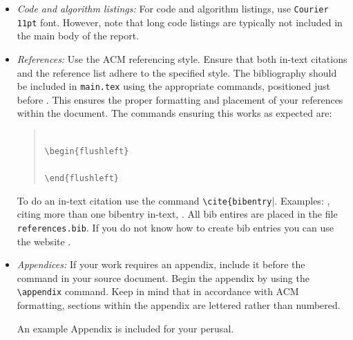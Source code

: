 \begin{itemize}
    \item \emph{Code and algorithm listings:} For code and algorithm listings, use \verb|Courier 11pt| font. However, note that long code listings are typically not included in the main body of the report.

    \item  \emph{References:} Use the ACM referencing style. Ensure that both in-text citations and the reference list adhere to the specified style. The bibliography should be included in \verb|main.tex| using the appropriate commands, positioned just before \verb||. This ensures the proper formatting and placement of your references within the document. The commands ensuring this works as expected are:
        \begin{quote}
            \verb||\\
            \verb|\begin{flushleft}|\\
                \verb|    |\\
            \verb|\end{flushleft}|
        \end{quote}

    To do an in-text citation use the command \verb|\cite{bibentry||. Examples: \cite{nguyen_deep_2021}, citing more than one bibentry in-text, \cite{ahamad_accentdb:_2020, yamoah_deep_2022, arik_deep_2017}. All bib entires are placed in the file \verb|references.bib|. If you do not know how to create bib entries you can use the website \href{https://zbib.org/}{\color{blue}{zoterobib}}.

    \item \emph{Appendices:} If your work requires an appendix, include it before the \verb|| command in your source document. Begin the appendix by using the \verb|\appendix| command. Keep in mind that in accordance with ACM formatting, sections within the appendix are lettered rather than numbered.

    An example Appendix is included for your perusal.
    

        
\end{itemize}

